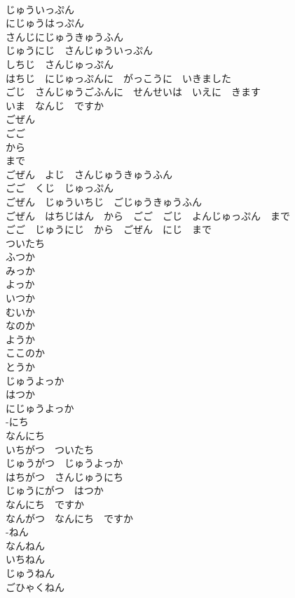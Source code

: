 \documentclass[8pt]{extreport}
\begin{document}
\begin{CJK}{UTF8}{min}
\\	じゅういっぷん	
\\	にじゅうはっぷん	
\\	さんじにじゅうきゅうふん	
\\	じゅうにじ　さんじゅういっぷん	
\\	しちじ　さんじゅっぷん	
\\	はちじ　にじゅっぷんに　がっこうに　いきました	
\\	ごじ　さんじゅうごふんに　せんせいは　いえに　きます	
\\	いま　なんじ　ですか	
\\	ごぜん	
\\	ごご	
\\	から	
\\	まで	
\\	ごぜん　よじ　さんじゅうきゅうふん	
\\	ごご　くじ　じゅっぷん	
\\	ごぜん　じゅういちじ　ごじゅうきゅうふん	
\\	ごぜん　はちじはん　から　ごご　ごじ　よんじゅっぷん　まで	
\\	ごご　じゅうにじ　から　ごぜん　にじ　まで	
\\	ついたち	
\\	ふつか	
\\	みっか	
\\	よっか	
\\	いつか	
\\	むいか	
\\	なのか	
\\	ようか	
\\	ここのか	
\\	とうか	
\\	じゅうよっか	
\\	はつか	
\\	にじゅうよっか	
\\	-にち	
\\	なんにち	
\\	いちがつ　ついたち	
\\	じゅうがつ　じゅうよっか	
\\	はちがつ　さんじゅうにち	
\\	じゅうにがつ　はつか	
\\	なんにち　ですか	
\\	なんがつ　なんにち　ですか	
\\	-ねん	
\\	なんねん	
\\	いちねん	
\\	じゅうねん	
\\	ごひゃくねん	

\end{CJK}
\end{document}
